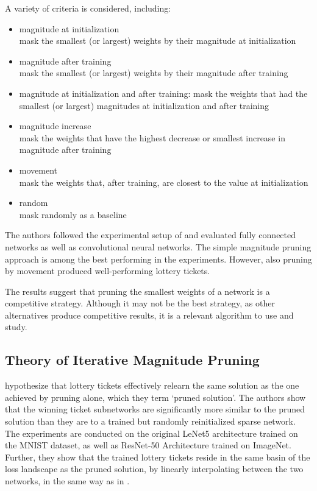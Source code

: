 A variety of criteria is considered, including: 
\begin{itemize}
\item magnitude at initialization \\
mask the smallest (or largest) weights by their magnitude at initialization
\item magnitude after training \\
mask the smallest (or largest) weights by their magnitude after training
\item magnitude at initialization and after training: mask the weights that had the smallest (or largest) magnitudes at initialization and after training
\item magnitude increase \\
mask the weights that have the highest decrease or smallest increase in magnitude after training
\item movement \\
mask the weights that, after training, are closest to the value at initialization
\item random \\
mask randomly as a baseline
\end{itemize}

The authors followed the experimental setup of \textcite{LTH} and evaluated fully connected networks as well as convolutional neural networks. The simple magnitude pruning approach is among the best performing in the experiments. However, also pruning by movement produced well-performing lottery tickets.

The results suggest that pruning the smallest weights of a network is a competitive strategy. Although it may not be the best strategy, as other alternatives produce competitive results, it is a relevant algorithm to use and study. 

\subsection{Theory of Iterative Magnitude Pruning}
\textcite{WhyLotteryTicketsWin} hypothesize that lottery tickets effectively relearn the same solution as the one achieved by pruning alone, which they term `pruned solution'.
The authors show that the winning ticket subnetworks are significantly more similar to the pruned solution than they are to a trained but randomly reinitialized sparse network.
The experiments are conducted on the original LeNet5 architecture trained on the MNIST dataset, as well as ResNet-50 Architecture trained on ImageNet. Further, they show that the trained lottery tickets reside in the same basin of the loss landscape as the pruned solution, by linearly interpolating between the two networks, in the same way as in \autocite{LinearModeConnectivity}.

